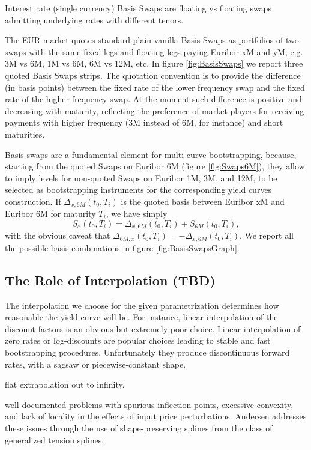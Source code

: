 \documentclass[11pt,reqno]{amsart}
\begin{document}
Interest rate (single currency) Basis Swaps are floating vs floating swaps admitting underlying rates with different tenors.
\par
The EUR market quotes standard plain vanilla Basis Swaps as portfolios of two swaps with the same fixed legs and floating legs paying Euribor xM and yM, e.g. 3M vs 6M, 1M vs 6M, 6M vs 12M, etc.
In figure \ref{fig:BasisSwaps} we report three quoted Basis Swaps strips.
The quotation convention is to provide the difference (in basis points) between the fixed rate of the lower frequency swap and the fixed rate of the higher frequency swap. At the moment such difference is positive and decreasing with maturity, reflecting the preference of market players for receiving payments with higher frequency (3M instead of 6M, for instance) and short maturities.
\par
Basis swaps are a fundamental element for multi curve bootstrapping, because, starting from the quoted Swaps on Euribor 6M (figure \ref{fig:Swaps6M}), they allow to imply levels for non-quoted Swaps on Euribor 1M, 3M, and 12M, to be selected as bootstrapping instruments for the corresponding yield curves construction.
If $\Delta_{x,6M}\left(t_0,T_i\right)$ is the quoted basis between Euribor xM and Euribor 6M for maturity $T_i$, we have simply
\begin{equation}
S_x\left(t_0,T_i\right) = \Delta_{x,6M}\left(t_0,T_i\right) + S_{6M}\left(t_0,T_i\right),
\label{eqn:BasisSwap}
\end{equation}
with the obvious caveat that
$\Delta_{6M,x}\left(t_0,T_i\right) = - \Delta_{x,6M}\left(t_0,T_i\right)$. We report all the possible basis combinations in figure \ref{fig:BasisSwapsGraph}.

\subsection{\label{sec:Interp}The Role of Interpolation (TBD)}
\par
The interpolation we choose for the given parametrization determines how reasonable the yield curve will be. For instance, linear interpolation of the discount factors is an obvious but extremely poor choice. Linear interpolation of zero rates or log-discounts are popular choices leading to stable and fast bootstrapping procedures. Unfortunately they produce discontinuous forward rates, with a sagsaw or piecewise-constant shape.

flat extrapolation out to infinity.

well-documented problems with spurious inflection points, excessive convexity, and lack of locality in the effects of input price perturbations. Andersen \cite{And07} addresses these issues through the use of shape-preserving splines from the class of generalized tension splines.
\end{document}
